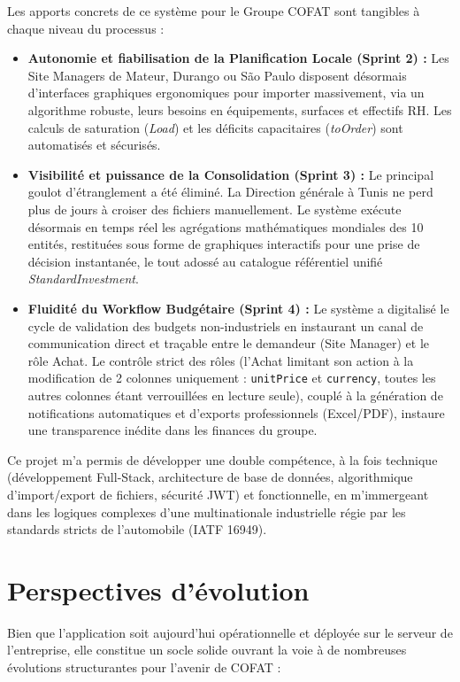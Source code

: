 Les apports concrets de ce système pour le Groupe COFAT sont tangibles à chaque niveau du processus :
\begin{itemize}
    \item \textbf{Autonomie et fiabilisation de la Planification Locale (Sprint 2) :} Les Site Managers de Mateur, Durango ou São Paulo disposent désormais d'interfaces graphiques ergonomiques pour importer massivement, via un algorithme robuste, leurs besoins en équipements, surfaces et effectifs RH. Les calculs de saturation (\textit{Load}) et les déficits capacitaires (\textit{toOrder}) sont automatisés et sécurisés.
    \item \textbf{Visibilité et puissance de la Consolidation (Sprint 3) :} Le principal goulot d'étranglement a été éliminé. La Direction générale à Tunis ne perd plus de jours à croiser des fichiers manuellement. Le système exécute désormais en temps réel les agrégations mathématiques mondiales des 10 entités, restituées sous forme de graphiques interactifs pour une prise de décision instantanée, le tout adossé au catalogue référentiel unifié \textit{StandardInvestment}.
    \item \textbf{Fluidité du Workflow Budgétaire (Sprint 4) :} Le système a digitalisé le cycle de validation des budgets non-industriels en instaurant un canal de communication direct et traçable entre le demandeur (Site Manager) et le rôle Achat. Le contrôle strict des rôles (l'Achat limitant son action à la modification de 2 colonnes uniquement : \texttt{unitPrice} et \texttt{currency}, toutes les autres colonnes étant verrouillées en lecture seule), couplé à la génération de notifications automatiques et d'exports professionnels (Excel/PDF), instaure une transparence inédite dans les finances du groupe.
\end{itemize}

Ce projet m'a permis de développer une double compétence, à la fois technique (développement Full-Stack, architecture de base de données, algorithmique d'import/export de fichiers, sécurité JWT) et fonctionnelle, en m'immergeant dans les logiques complexes d'une multinationale industrielle régie par les standards stricts de l'automobile (IATF 16949).

\section*{Perspectives d'évolution}

Bien que l'application soit aujourd'hui opérationnelle et déployée sur le serveur de l'entreprise, elle constitue un socle solide ouvrant la voie à de nombreuses évolutions structurantes pour l'avenir de COFAT :

